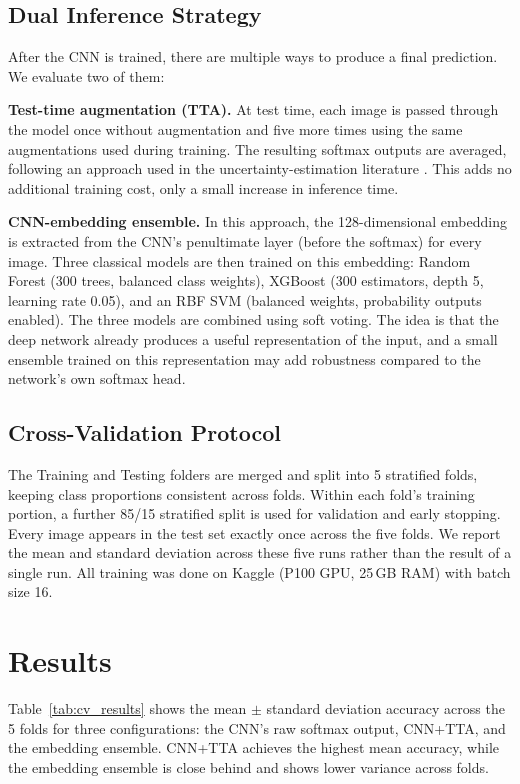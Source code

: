 \documentclass[conference]{IEEEtran}
\begin{document}
\subsection{Dual Inference Strategy}
\label{sec:inference}
After the CNN is trained, there are multiple ways to produce a final prediction. We evaluate two of them:

\textbf{Test-time augmentation (TTA).} At test time, each image is passed through the model once without augmentation and five more times using the same augmentations used during training. The resulting softmax outputs are averaged, following an approach used in the uncertainty-estimation literature \cite{wang2019tta}. This adds no additional training cost, only a small increase in inference time.

\textbf{CNN-embedding ensemble.} In this approach, the 128-dimensional embedding is extracted from the CNN's penultimate layer (before the softmax) for every image. Three classical models are then trained on this embedding: Random Forest \cite{breiman2001randomforests} (300 trees, balanced class weights), XGBoost \cite{chen2016xgboost} (300 estimators, depth 5, learning rate 0.05), and an RBF SVM (balanced weights, probability outputs enabled). The three models are combined using soft voting. The idea is that the deep network already produces a useful representation of the input, and a small ensemble trained on this representation may add robustness compared to the network's own softmax head.

\subsection{Cross-Validation Protocol}
The Training and Testing folders are merged and split into 5 stratified folds, keeping class proportions consistent across folds. Within each fold's training portion, a further 85/15 stratified split is used for validation and early stopping. Every image appears in the test set exactly once across the five folds. We report the mean and standard deviation across these five runs rather than the result of a single run. All training was done on Kaggle (P100 GPU, 25\,GB RAM) with batch size 16.


\section{Results}

Table~\ref{tab:cv_results} shows the mean $\pm$ standard deviation accuracy across the 5 folds for three configurations: the CNN's raw softmax output, CNN+TTA, and the embedding ensemble. CNN+TTA achieves the highest mean accuracy, while the embedding ensemble is close behind and shows lower variance across folds.
\end{document}
